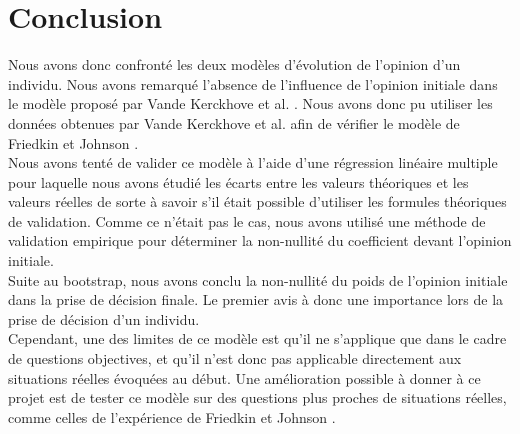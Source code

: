 \documentclass{scrreprt}
\begin{document}
\chapter{Conclusion}

Nous avons donc confronté les deux modèles d'évolution de l'opinion d'un individu. Nous avons remarqué l'absence de l'influence de l'opinion initiale dans le modèle proposé par Vande Kerckhove et al. \cite{VMG}. Nous avons donc pu utiliser les données obtenues par Vande Kerckhove et al. \cite{VMG} afin de vérifier le modèle de Friedkin et Johnson \cite{FJ}.\\

Nous avons tenté de valider ce modèle à l'aide d'une régression linéaire multiple pour laquelle nous avons étudié les écarts entre les valeurs théoriques et les valeurs réelles de sorte à savoir s'il était possible d'utiliser les formules théoriques de validation. Comme ce n'était pas le cas, nous avons utilisé une méthode de validation empirique pour déterminer la non-nullité du coefficient devant l'opinion initiale.\\

Suite au bootstrap, nous avons conclu la non-nullité du poids de l'opinion initiale dans la prise de décision finale. Le premier avis à donc une importance lors de la prise de décision d'un individu. \\

Cependant, une des limites de ce modèle est qu'il ne s'applique que dans le cadre de questions objectives, et qu'il n'est donc pas applicable directement aux situations réelles évoquées au début. Une amélioration possible à donner à ce projet est de tester ce modèle sur des questions plus proches de situations réelles, comme celles de l'expérience de Friedkin et Johnson \cite{FJ}.\\


  



\end{document}
